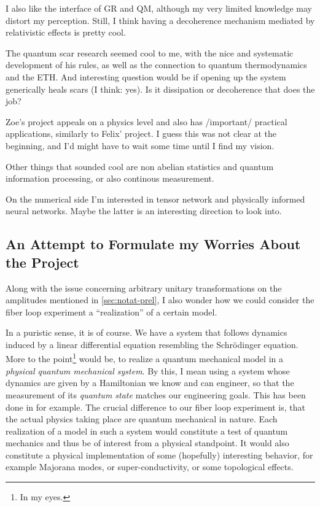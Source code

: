 \documentclass[fontsize=10pt,paper=a4,open=any,
twoside=no,toc=listof,toc=bibliography,headings=optiontohead,
captions=nooneline,captions=tableabove,english,DIV=15,numbers=noenddot,final,parskip=half-,
headinclude=true,footinclude=false,BCOR=0mm]{scrartcl}
\begin{document}
I also like the interface of GR and QM, although my very limited
knowledge may distort my perception. Still, I think having a
decoherence mechanism mediated by relativistic effects is pretty cool.

The quantum scar research seemed cool to me, with the nice and
systematic development of his rules, as well as the connection to
quantum thermodynamics and the ETH. And interesting question would be
if opening up the system generically heals scars (I think: yes). Is it
dissipation or decoherence that does the job?

Zoe's project appeals on a physics level and also has /important/
practical applications, similarly to Felix' project. I guess this was
not clear at the beginning, and I'd might have to wait some time until
I find my vision.

Other things that sounded cool are non abelian statistics and quantum
information processing, or also continous measurement.

On the numerical side I'm interested in tensor network and physically
informed neural networks. Maybe the latter is an interesting direction
to look into.

\subsection{An Attempt to Formulate my Worries About the Project}
\label{sec:an-attempt-formulate}

Along with the issue concerning arbitrary unitary transformations on
the amplitudes mentioned in \cref{sec:notat-prel}, I also wonder how
we could consider the fiber loop experiment a ``realization'' of a
certain model.

In a puristic sense, it is of course. We have a system that follows
dynamics induced by a linear differential equation resembling the
Schr\"odinger equation. More to the point\footnote{In my eyes.} would
be, to realize a quantum mechanical model in a \emph{physical quantum
  mechanical system}. By this, I mean using a system whose dynamics
are given by a Hamiltonian we know and can engineer, so that the
measurement of its \emph{quantum state} matches our engineering
goals. This has been done in \cite{Roushan2014} for example. The
crucial difference to our fiber loop experiment is, that the actual
physics taking place are quantum mechanical in nature. Each
realization of a model in such a system would constitute a test of
quantum mechanics and thus be of interest from a physical
standpoint. It would also constitute a physical implementation of some
(hopefully) interesting behavior, for example Majorana modes, or
super-conductivity, or some topological effects.
\end{document}
